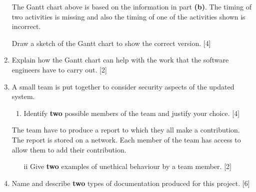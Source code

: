 \begin{enumerate}
The Gantt chart above is based on the information in part \textbf{(b)}.
The timing of two activities is missing and also the timing of one
of the activities shown is incorrect.

Draw a sketch of the Gantt chart to show the correct version. \hfill{}{[}4{]}
\item Explain how the Gantt chart can help with the work that the software
engineers have to carry out. \hfill{}{[}2{]}
\item A small team is put together to consider security aspects of the updated
system.
\begin{enumerate}
\item Identify \textbf{two} possible members of the team and justify your
choice.\hfill{} {[}4{]}
\end{enumerate}
The team have to produce a report to which they all make a contribution.
The report is stored on a network. Each member of the team has access
to allow them to add their contribution.
\begin{enumerate}
\item[ii]  Give \textbf{two} examples of unethical behaviour by a team member.\hfill{}
{[}2{]}
\end{enumerate}
\item Name and describe \textbf{two} types of documentation produced for
this project.\hfill{} {[}6{]}


\end{enumerate}
